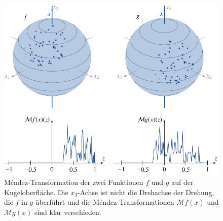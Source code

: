 %
%
%
\begin{figure}
\centering
\includegraphics{chapters/070-nichtkomm/images/MTransformExamples.pdf}
\caption{Méndez-Transformation der zwei Funktionen $f$ und $g$ auf
der Kugeloberfläche.
Die $x_3$-Achse ist nicht die Drehachse der Drehung, die $f$ in $g$
überführt und die Méndez-Transformationen $\mathcal{M}f(x)$
und $\mathcal{M}g(x)$ sind klar verschieden.
\label{buch:nichtkomm:fig:mtex}}
\end{figure}

